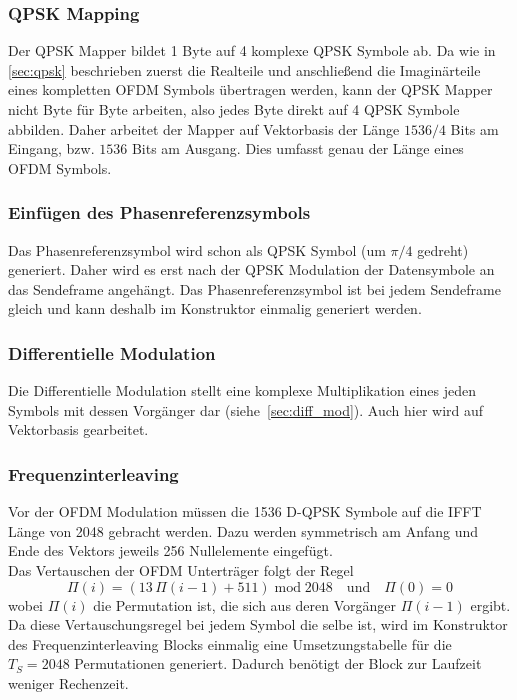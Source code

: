 \subsubsection{QPSK Mapping}
Der QPSK Mapper bildet 1 Byte auf 4 komplexe QPSK Symbole ab. Da wie in \ref{sec:qpsk} beschrieben zuerst die Realteile und anschließend die Imaginärteile eines kompletten OFDM Symbols übertragen werden, kann der QPSK Mapper nicht Byte für Byte arbeiten, also jedes Byte direkt auf 4 QPSK Symbole abbilden. Daher arbeitet der Mapper auf Vektorbasis der Länge $1536/4$ Bits am Eingang, bzw. $1536$ Bits am Ausgang. Dies umfasst genau der Länge eines OFDM Symbols.

\subsubsection{Einfügen des Phasenreferenzsymbols}
Das Phasenreferenzsymbol wird schon als QPSK Symbol (um $\pi/4$ gedreht) generiert. Daher wird es erst nach der QPSK Modulation der Datensymbole an das Sendeframe angehängt. Das Phasenreferenzsymbol ist bei jedem Sendeframe gleich und kann deshalb im Konstruktor einmalig generiert werden.

\subsubsection{Differentielle Modulation}
Die Differentielle Modulation stellt eine komplexe Multiplikation eines jeden Symbols mit dessen Vorgänger dar (siehe~\ref{sec:diff_mod}). Auch hier wird auf Vektorbasis gearbeitet.

\subsubsection{Frequenzinterleaving}
Vor der OFDM Modulation müssen die 1536 D-QPSK Symbole auf die IFFT Länge von 2048 gebracht werden. Dazu werden symmetrisch am Anfang und Ende des Vektors jeweils 256 Nullelemente eingefügt.\\
Das Vertauschen der OFDM Unterträger folgt der Regel
\begin{equation}
\Pi(i) = (13\, \Pi(i-1) + 511)\; \text{mod}\; 2048 \quad \text{und} \quad \Pi (0) = 0
\end{equation}
wobei $\Pi(i)$ die Permutation ist, die sich aus deren Vorgänger $\Pi(i-1)$ ergibt. Da diese Vertauschungsregel bei jedem Symbol die selbe ist, wird im Konstruktor des Frequenzinterleaving Blocks einmalig eine Umsetzungstabelle für die $T_S=2048$ Permutationen generiert. Dadurch benötigt der Block zur Laufzeit weniger Rechenzeit.

